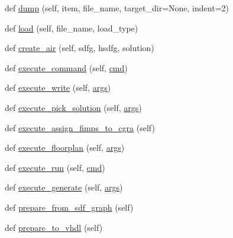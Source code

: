 \begin{DoxyCompactItemize}
\item 
def \hyperlink{classsylva_1_1misc_1_1exec_1_1_s_y_l_v_a_a069be4000eb357f5b2088f408ded6ef0}{dump} (self, item, file\+\_\+name, target\+\_\+dir=None, indent=2)
\item 
def \hyperlink{classsylva_1_1misc_1_1exec_1_1_s_y_l_v_a_a848ae0b83bbf7a02a22b2958dd1388f8}{load} (self, file\+\_\+name, load\+\_\+type)
\item 
def \hyperlink{classsylva_1_1misc_1_1exec_1_1_s_y_l_v_a_a0fb6646b35fdfc07ca05bb2435e4d117}{create\+\_\+air} (self, sdfg, hsdfg, solution)
\item 
def \hyperlink{classsylva_1_1misc_1_1exec_1_1_s_y_l_v_a_a6e8ae0e377770a6669d6c9544b7b55db}{execute\+\_\+command} (self, \hyperlink{namespacesylva_1_1misc_1_1exec_a49db5f46508c96872b9fd91c17271a25}{cmd})
\item 
def \hyperlink{classsylva_1_1misc_1_1exec_1_1_s_y_l_v_a_a395e3cd0c375c051762dd035dbbfe9b4}{execute\+\_\+write} (self, \hyperlink{namespacesylva_1_1misc_1_1exec_a4e70593929af3f6aa7fa94d0b4318766}{args})
\item 
def \hyperlink{classsylva_1_1misc_1_1exec_1_1_s_y_l_v_a_a06ccbb90cddd35e6f7c037bbc5148e93}{execute\+\_\+pick\+\_\+solution} (self, \hyperlink{namespacesylva_1_1misc_1_1exec_a4e70593929af3f6aa7fa94d0b4318766}{args})
\item 
def \hyperlink{classsylva_1_1misc_1_1exec_1_1_s_y_l_v_a_ae0feb4c294c27982ca22fcae8bd040f8}{execute\+\_\+assign\+\_\+fimps\+\_\+to\+\_\+cgra} (self)
\item 
def \hyperlink{classsylva_1_1misc_1_1exec_1_1_s_y_l_v_a_ad398d309b523adda00dcb7929c568e65}{execute\+\_\+floorplan} (self, \hyperlink{namespacesylva_1_1misc_1_1exec_a4e70593929af3f6aa7fa94d0b4318766}{args})
\item 
def \hyperlink{classsylva_1_1misc_1_1exec_1_1_s_y_l_v_a_ab4675d585d77d48f755842f22f9f845a}{execute\+\_\+run} (self, \hyperlink{namespacesylva_1_1misc_1_1exec_a49db5f46508c96872b9fd91c17271a25}{cmd})
\item 
def \hyperlink{classsylva_1_1misc_1_1exec_1_1_s_y_l_v_a_a11805867dcb2df10927531d78d9c26ca}{execute\+\_\+generate} (self, \hyperlink{namespacesylva_1_1misc_1_1exec_a4e70593929af3f6aa7fa94d0b4318766}{args})
\item 
def \hyperlink{classsylva_1_1misc_1_1exec_1_1_s_y_l_v_a_a67e8f5e9056dc12db86331eb50494e7c}{prepare\+\_\+from\+\_\+sdf\+\_\+graph} (self)
\item 
def \hyperlink{classsylva_1_1misc_1_1exec_1_1_s_y_l_v_a_a01eb55c566fcdf14c0aef3361b49f38d}{prepare\+\_\+to\+\_\+vhdl} (self)

\end{DoxyCompactItemize}

